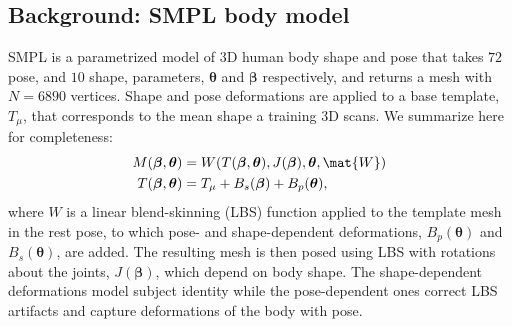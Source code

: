 \documentclass[acmtog]{acmart}
\begin{document}
\subsection{Background: SMPL body model}\label{sec:SMPL}
SMPL is a parametrized model of 3D human body shape and pose that takes $72$ pose, and $10$ shape, parameters, $\boldsymbol{\theta}$ and $\boldsymbol{\beta}$ respectively, and returns a mesh with $N = 6890$ vertices. Shape and pose deformations are applied to a base template, $T_\mu$, that corresponds to the mean shape a training 3D scans. We summarize \cite{loper2015smpl} here for completeness:
\begin{align}
M(\boldsymbol{\beta}, \boldsymbol{\theta}) &= W(T(\boldsymbol{\beta}, \boldsymbol{\theta}), J(\boldsymbol{\beta}), \boldsymbol{\theta},\mat{W}) \\
T(\boldsymbol{\beta}, \boldsymbol{\theta}) &= T_\mu + B_s(\boldsymbol{\beta}) + B_p(\boldsymbol{\theta}),
\end{align}
where $W$ is a linear blend-skinning (LBS) function applied to the template mesh in the rest pose, to which pose- and shape-dependent deformations, $B_p(\boldsymbol{\theta})$ and $B_s(\boldsymbol{\theta})$, are added. The resulting mesh is then posed using LBS with rotations about the joints, $J(\boldsymbol{\beta})$, which depend on body shape. The shape-dependent deformations model subject identity while the pose-dependent ones correct LBS artifacts and capture deformations of the body with pose. 
\end{document}

